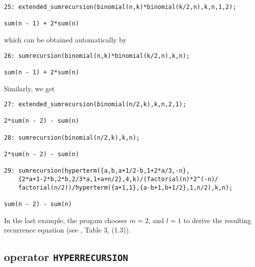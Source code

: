 {\small
\begin{verbatim}
25: extended_sumrecursion(binomial(n,k)*binomial(k/2,n),k,n,1,2);

sum(n - 1) + 2*sum(n)
\end{verbatim}
}\noindent
which can be obtained automatically by
{\small
\begin{verbatim}
26: sumrecursion(binomial(n,k)*binomial(k/2,n),k,n);

sum(n - 1) + 2*sum(n)
\end{verbatim}
}\noindent
Similarly, we get
{\small
\begin{verbatim}
27: extended_sumrecursion(binomial(n/2,k),k,n,2,1);

2*sum(n - 2) - sum(n)

28: sumrecursion(binomial(n/2,k),k,n);

2*sum(n - 2) - sum(n)

29: sumrecursion(hyperterm({a,b,a+1/2-b,1+2*a/3,-n},
    {2*a+1-2*b,2*b,2/3*a,1+a+n/2},4,k)/(factorial(n)*2^(-n)/
    factorial(n/2))/hyperterm({a+1,1},{a-b+1,b+1/2},1,n/2),k,n);

sum(n - 2) - sum(n)
\end{verbatim}
}\noindent
In the last example, the progam chooses $m=2$, and $l=1$ to derive the
resulting recurrence equation (see \cite{Koepf}, Table 3, (1.3)).


\subsection{\REDUCE{} operator {\tt HYPERRECURSION}}

